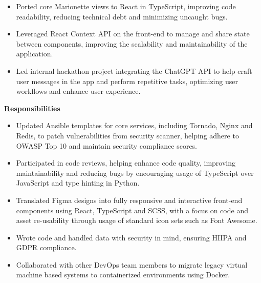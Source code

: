 \documentclass[11pt,a4paper,sans]{moderncv}        %
\begin{document}
{\begin{itemize}
\item Ported core Marionette views to React in TypeScript, improving code readability, reducing technical debt and minimizing uncaught bugs.
\item Leveraged React Context API on the front-end to manage and share state between components, improving the scalability and maintainability of the application.
\item Led internal hackathon project integrating the ChatGPT API to help craft user messages in the app and perform repetitive tasks, optimizing user workflows and enhance user experience.
   \end{itemize}
\textbf{Responsibilities}
	\begin{itemize}
\item Updated Ansible templates for core services, including Tornado, Nginx and Redis, to patch vulnerabilities from security scanner, helping adhere to OWASP Top 10 and maintain security compliance scores.
\item Participated in code reviews, helping enhance code quality, improving maintainability and reducing bugs by encouraging usage of TypeScript over JavaScript and type hinting in Python.
\item Translated Figma designs into fully responsive and interactive front-end components using React, TypeScript and SCSS, with a focus on code and asset re-usability through usage of standard icon sets such as Font Awesome.
\item Wrote code and handled data with security in mind, ensuring HIIPA and GDPR compliance.
\item Collaborated with other DevOps team members to migrate legacy virtual machine based systems to containerized environments using Docker.
	\end{itemize}
}

\end{document}
